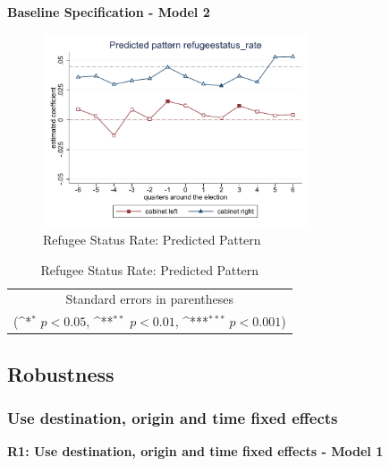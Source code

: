 \documentclass[10pt,a4paper]{scrartcl}
\begin{document}
\clearpage
\textbf{Baseline Specification - Model 2}
\begin{figure}[!ht]
	\centering
	\includegraphics[width=0.7\textwidth]{figures_edited/refugeestatus_rate_graph2_baseline.pdf}
	\caption{Refugee Status Rate: Predicted Pattern}
\end{figure}

\begin{table}[!ht]\centering
	\footnotesize
	\renewcommand{\arraystretch}{1.2}
	\def\sym#1{\ifmmode^{#1}\else\(^{#1}\)\fi}
	\caption{Refugee Status Rate: Predicted Pattern}
	\begin{tabular}{l*{2}{c}}
		\hline\hline
		
		\hline\hline
		\multicolumn{3}{c}{\footnotesize Standard errors in parentheses} \\
		\multicolumn{3}{c}{\footnotesize (\sym{*} \(p<0.05\), \sym{**} \(p<0.01\), \sym{***} \(p<0.001\))}\\
	\end{tabular}
\end{table}



\FloatBarrier
\clearpage
\subsection{Robustness}

\subsubsection{Use destination, origin and time fixed effects}
\textbf{ R1: Use destination, origin and time fixed effects - Model 1}
\end{document}
